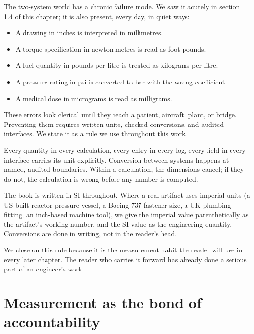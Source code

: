 The two-system world has a chronic failure mode. We saw it acutely in
section 1.4 of this chapter; it is also present, every day, in
quiet ways:

\begin{itemize}[leftmargin=*]
  \item A drawing in inches is interpreted in millimetres.
  \item A torque specification in newton metres is read as
    foot pounds.
  \item A fuel quantity in pounds per litre is treated as kilograms
    per litre.
  \item A pressure rating in psi is converted to bar with the wrong
    coefficient.
  \item A medical dose in micrograms is read as milligrams.
\end{itemize}

These errors look clerical until they reach a patient, aircraft,
plant, or bridge. Preventing them requires written units, checked
conversions, and audited interfaces. We state it as a rule we use
throughout this work.

\begin{principle}
Every quantity in every calculation, every entry in every log, every
field in every interface carries its unit explicitly. Conversion
between systems happens at named, audited boundaries. Within a
calculation, the dimensions cancel; if they do not, the calculation
is wrong before any number is computed.
\end{principle}



The book is written in SI throughout. Where a real artifact uses
imperial units (a US-built reactor pressure vessel, a Boeing 737
fastener size, a UK plumbing fitting, an inch-based machine tool),
we give the imperial value parenthetically as the artifact's
working number, and the SI value as the engineering quantity.
Conversions are done in writing, not in the reader's head.

We close on this rule because it is the measurement habit the reader
will use in every later chapter. The reader who carries it forward
has already done a serious part of an engineer's work.

\section{Measurement as the bond of accountability}

